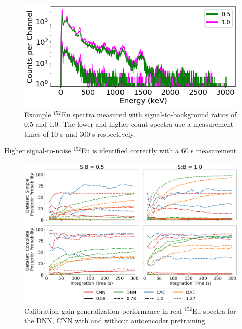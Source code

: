 \begin{figure}[H]
	\centering
	\includegraphics[width=0.85\linewidth]{images/realspectra-cal-eu152-spec}
	\caption{Example $^{152}$Eu spectra measured with signal-to-background ratios of 0.5 and 1.0. The lower and higher count spectra use a measurement times of 10 s and 300 s respectively.}
	\label{fig:realspectra-cal-eu152-spec}
\end{figure}

Higher signal-to-noise $^{152}$Eu is identified correctly with a 60 s measurement 





\begin{figure}[H]
	\centering
	\includegraphics[width=1.0\linewidth]{images/realspectra-cal-eu152}
	\caption{Calibration gain generalization performance in real $^{152}$Eu spectra for the DNN, CNN with and without autoencoder pretraining.}
	\label{fig:realspectra-cal-eu152}
\end{figure}

